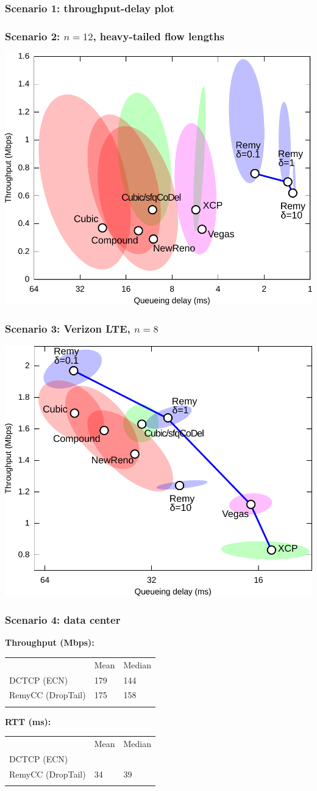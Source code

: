 \documentclass[svgnames]{beamer}
\newcommand{\ssline}{\vspace{8 pt}}
\begin{document}
\begin{frame}
\frametitle{Scenario 1: throughput-delay plot}

\begin{centering}

\end{centering}
\end{frame}

\begin{frame}
\frametitle{Scenario 2: $n = 12$, heavy-tailed flow lengths}

\begin{centering}
\includegraphics[width=8.5 cm]{eth12-final-flowcdf.pdf}

\end{centering}

\end{frame}

\begin{frame}
\frametitle{Scenario 3: Verizon LTE, $n = 8$}

\begin{centering}
\includegraphics[width=8.5 cm]{vzw-8-final.pdf}

\end{centering}
\end{frame}

\begin{frame}
\frametitle{Scenario 4: data center}

\textbf{Throughput (Mbps):}

\begin{tabular}{lll}
&  Mean &  Median \\
 DCTCP (ECN) & \cellcolor{Green} 179 & 144 \\
 RemyCC (DropTail) & 175 & \cellcolor{Green} 158 \\
\vspace{\baselineskip}
\end{tabular}

\ssline
\ssline

\textbf{RTT (ms):}

\begin{tabular}{lll}
&  Mean &  Median \\
 DCTCP (ECN) & \cellcolor{Green}{7.5} & \cellcolor{Green}{6.4} \\
 RemyCC (DropTail) & {34} & {39} \\
\vspace{\
\end{tabular}
\end{frame}
\end{document}
